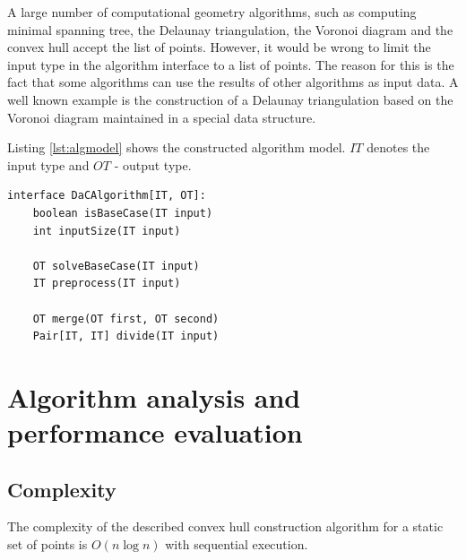 \documentclass[a4paper,UKenglish,cleveref, autoref]{socg-lipics-v2019}
\begin{document}
	A large number of computational geometry algorithms, such as computing minimal spanning tree, the Delaunay triangulation, the Voronoi diagram and the convex hull accept the list of points. However, it would be wrong to limit the input type in the algorithm interface to a list of points. The reason for this is the fact that some algorithms can use the results of other algorithms as input data. A well known example is the construction of a Delaunay triangulation based on the Voronoi diagram maintained in a special data structure.
	
	Listing \ref{lst:algmodel} shows the constructed algorithm model. $IT$ denotes the input type and $OT$ - output type.
	
	\begin{lstlisting}[caption={Algorithm model based on the ``divide-and-conquer'' principle},label={lst:algmodel},captionpos=t,float,abovecaptionskip=-\medskipamount]
interface DaCAlgorithm[IT, OT]:
    boolean isBaseCase(IT input)
    int inputSize(IT input)

    OT solveBaseCase(IT input)
    IT preprocess(IT input)

    OT merge(OT first, OT second)
    Pair[IT, IT] divide(IT input)
	\end{lstlisting}
	
	
\section{Algorithm analysis and performance evaluation}
\label{sec:algorithm-analysis-and-performance-evaluation}
\subsection{Complexity}



	\begin{theorem}
		The complexity of the described convex hull construction algorithm for a static set of points is $O(n\log n)$ with sequential execution.
	\end{theorem}
	
\end{document}
